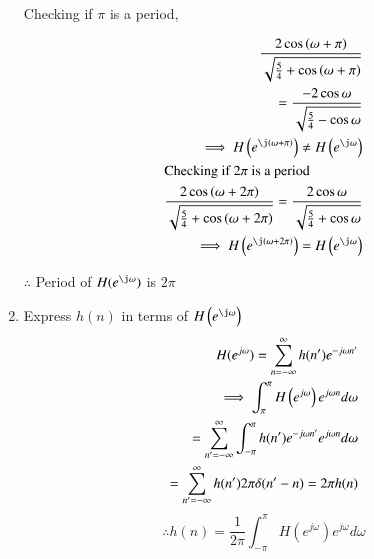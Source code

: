 \documentclass[journal,12pt,twocolumn]{IEEEtran}
\renewcommand\thesection{\arabic{section}}
\begin{document}
\begin{enumerate}[label=\thesection.\arabic*]
			Checking if $\pi$ is a period,
			
			\begin{align}
				\frac{2\cos\brak{\omega+\pi}}{\sqrt{\frac{5}{4}+\cos\brak{\omega+\pi}}}\\ =
				\frac{-2\cos\omega}{\sqrt{\frac{5}{4}-\cos\omega}}\\
				\implies H\brak{e^{\j \brak{\omega+\pi}}} \neq H\brak{e^{\j \omega}}\\
				\intertext{Checking if $2\pi$ is a period}
				\dfrac{2\cos\brak{\omega+2\pi}}{\sqrt{\frac{5}{4}+\cos\brak{\omega + 2\pi}}} =
				\frac{2\cos \omega}{\sqrt{\frac{5}{4} + \cos \omega }}\\
				\implies H\brak{e^{\j \brak{\omega + 2\pi}}} = H\brak{e^{\j \omega}}
			\end{align}
			
			$\therefore$ Period of $H(e^{\j \omega})$ is $2\pi$\\
			\item Express $h(n)$ in terms of $H\brak{e^{\j \omega}}$ \\[5pt]
			\solution
			\begin{align}
				H( e^{j\omega }) =\sum ^{\infty }_{n=-\infty }h(n') e^{-j\omega n'}\\
				\implies \int_{\-\pi} ^{\pi }	H\left( e^{j\omega }\right) e^{j\omega n}d\omega\\			
				= \sum_{n'=-\infty }^{\infty } \int ^{\pi }_{-\pi }h(n') e^{-j\omega n'}e^{j\omega n}d\omega\\			
				=\sum ^{\infty }_{n'=-\infty }h(n') 2\pi \delta(n'- n) =
				2\pi h(n) 
			\end{align}
			\begin{equation}
				\therefore	 h(n) =\dfrac{1}{2\pi }\int ^{\pi }_{-\pi }H\left( e^{j \omega}\right) e^{j\omega }d\omega 
			\end{equation}
			
		\end{enumerate}
		
\end{document}
